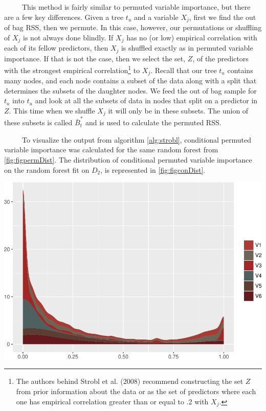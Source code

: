 \documentclass[12pt,twoside]{reedthesis}
\let\origfigure\figure
\let\endorigfigure\endfigure
\renewenvironment{figure}[1][2] {
    \expandafter\origfigure\expandafter[H]
} {
    \endorigfigure
}
\begin{document}
  ~~~~~This method is fairly similar to permuted variable importance, but
  there are a few key differences. Given a tree \(t_u\) and a variable
  \(X_j\), first we find the out of bag RSS, then we permute. In this
  case, however, our permutations or shuffling of \(X_j\) is not always
  done blindly. If \(X_j\) has no (or low) empirical correlation with each
  of its fellow predictors, then \(X_j\) is shuffled exactly as in
  permuted variable importance. If that is not the case, then we select
  the set, \(Z\), of the predictors with the strongest empirical
  correlation\footnote{The authors behind Strobl et al. (2008) recommend
    constructing the set \(Z\) from prior information about the data or as
    the set of predictors where each one has empirical correlation greater
    than or equal to .2 with \(X_j\).} to \(X_j\). Recall that our tree
  \(t_u\) contains many nodes, and each node contains a subset of the data
  along with a split that determines the subsets of the daughter nodes. We
  feed the out of bag sample for \(t_u\) into \(t_u\) and look at all the
  subsets of data in nodes that split on a predictor in \(Z\). This time
  when we shuffle \(X_j\) it will only be in these subsets. The union of
  these subsets is called \(\bar{B}_t^*\) and is used to calculate the
  permuted RSS.
  
  ~~~~~To visualize the output from algorithm \ref{alg:strobl},
  conditional permuted variable importance was calculated for the same
  random forest from \ref{fig:figpermDist}. The distribution of
  conditional permuted variable importance on the random forest fit on
  \(D_2\), is represented in \ref{fig:figconDist}.
  
  \begin{figure}[htbp]
  \centering
  \includegraphics{Thesis_files/figure-latex/unnamed-chunk-26-1.pdf}
  \caption{\label{fig:unnamed-chunk-26}\label{fig:figconDist}The distribution
  of conditional permuted variable importance for the first six variables
  in D2.}
  \end{figure}
  
\end{document}
